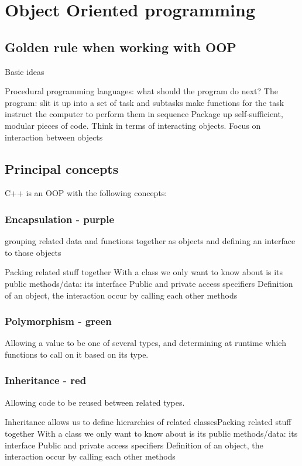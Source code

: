 \section{Object Oriented programming}


\subsection{Golden rule when working with OOP}

	Basic ideas

	Procedural programming languages: what should the program do next? The program: 
	slit it up into a set of task and subtasks 
	make functions for the task 
	instruct the computer to perform them in sequence
	Package up self-sufficient, modular pieces of code. Think in terms of interacting objects.
	Focus on interaction between objects 


\subsection{Principal concepts}
C++ is an OOP with the following concepts: 

\subsubsection{Encapsulation - purple}
grouping related data and functions together as objects and defining an interface to those objects

Packing related stuff together 
With a class we only want to know about is its public methods/data: its interface
Public and private access specifiers
Definition of an object, the interaction occur by calling each other methods


\subsubsection{Polymorphism -  green}
Allowing a value to be one of several types, and determining at runtime which functions to call on it based on its type. 

\subsubsection{Inheritance - red}
Allowing code to be reused between related types. 

Inheritance allows us to define hierarchies of related classesPacking related stuff together 
With a class we only want to know about is its public methods/data: its interface
Public and private access specifiers
Definition of an object, the interaction occur by calling each other methods

